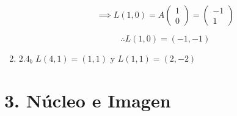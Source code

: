 \documentclass{article}
\begin{document}
\begin{enumerate}
			\begin{equation*}
				\implies L(1,0)=A
				\begin{pmatrix}
					1 \\
					0
				\end{pmatrix}
				=
				\begin{pmatrix}
					-1 \\
					1
				\end{pmatrix}
			\end{equation*}
			
			\begin{equation*}
				\boxed{\therefore L(1,0)=(-1,-1)}
			\end{equation*}
			
			
			\item \(2.4_b\) \(L(4,1)=(1,1)\) y \(L(1,1)=(2,-2)\)
			
		\end{enumerate}
		
		\section*{3. Núcleo e Imagen}
		
\end{document}
